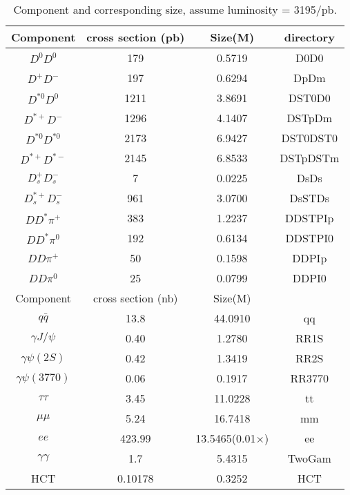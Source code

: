 \documentclass[12pt,a4paper,oneside]{article}
\begin{document}
\begin{table}[htp]
\begin{center}
\caption{Component and corresponding size, assume luminosity = 3195/pb.}
\begin{tabular}{c|c|c|c} \hline
Component        & cross section (pb) & Size(M) & directory \\ \hline
$D^{0}D^{0}$     &        179         & 0.5719  &  D0D0 \\
$D^{+}D^{-}$     &        197         & 0.6294  &  DpDm \\
$D^{*0}D^{0}$    &       1211         & 3.8691  &  DST0D0 \\
$D^{*+}D^{-}$    &       1296         & 4.1407  &  DSTpDm \\
$D^{*0}D^{*0}$   &       2173         & 6.9427  &  DST0DST0 \\
$D^{*+}D^{*-}$   &       2145         & 6.8533  &  DSTpDSTm \\
$D_{s}^{+}D_{s}^{-}$ &      7         & 0.0225  &  DsDs \\
$D_{s}^{*+}D_{s}^{-}$ &   961         & 3.0700  &  DsSTDs \\
\hline
$DD^{*}\pi^{+}$  &        383         & 1.2237  &  DDSTPIp \\
$DD^{*}\pi^{0}$  &        192         & 0.6134  &  DDSTPI0 \\
$DD\pi^{+}$      &         50         & 0.1598  &  DDPIp \\
$DD\pi^{0}$      &         25         & 0.0799  &  DDPI0 \\
\hline
Component        &  cross section (nb)& Size(M)\\ \hline
$q\bar{q}$       &       13.8         & 44.0910  & qq \\
$\gamma J/\psi$  &        0.40        &  1.2780  & RR1S \\
$\gamma \psi(2S)$&        0.42        &  1.3419  & RR2S \\
$\gamma \psi(3770)$ &     0.06        &  0.1917  & RR3770 \\
$\tau \tau$      &        3.45        & 11.0228  & tt \\
$\mu \mu$        &        5.24        & 16.7418  & mm \\
$ee$             &      423.99        & 13.5465(0.01$\times$)  & ee\\
$\gamma \gamma$  &        1.7         &  5.4315   & TwoGam \\
HCT              &        0.10178     &  0.3252   & HCT \\
\hline
\end{tabular}
\label{tab:genMC}
\end{center}


\end{table}
\end{document}
